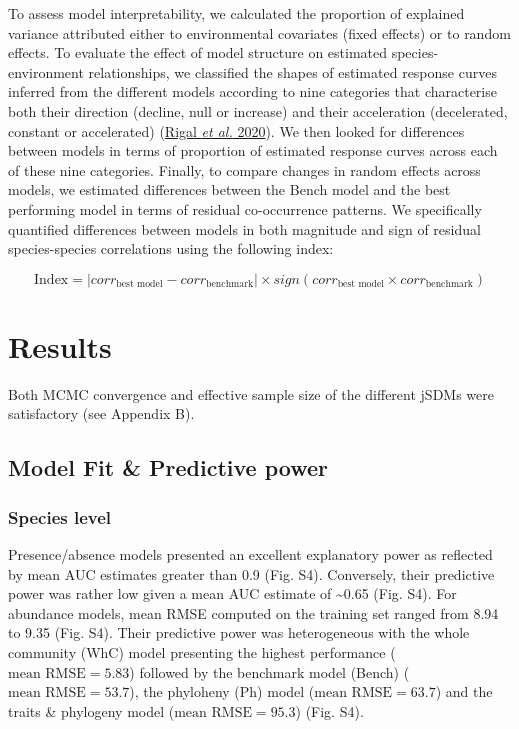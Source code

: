 \documentclass[9pt,biorxiv,doublespacing,lineno]{lapreprint}
\begin{document}
To assess model interpretability, we calculated the proportion of
explained variance attributed either to environmental covariates (fixed
effects) or to random effects. To evaluate the effect of model structure
on estimated species-environment relationships, we classified the shapes
of estimated response curves inferred from the different models
according to nine categories that characterise both their direction
(decline, null or increase) and their acceleration (decelerated,
constant or accelerated) (\protect\hyperlink{ref-Rigal_2020}{Rigal
\emph{et al.} 2020}). We then looked for differences between models in
terms of proportion of estimated response curves across each of these
nine categories. Finally, to compare changes in random effects across
models, we estimated differences between the Bench model and the best
performing model in terms of residual co-occurrence patterns. We
specifically quantified differences between models in both magnitude and
sign of residual species-species correlations using the following index:

\[\text{Index} = |corr_{\text{best model}} - corr_{\text{benchmark}}| \times sign(corr_{\text{best model}} \times corr_{\text{benchmark}})\]

\hypertarget{results}{%
\section{Results}\label{results}}

Both MCMC convergence and effective sample size of the different jSDMs
were satisfactory (see Appendix B).

\hypertarget{model-fit-predictive-power}{%
\subsection{Model Fit \& Predictive
power}\label{model-fit-predictive-power}}

\hypertarget{species-level}{%
\subsubsection{Species level}\label{species-level}}

Presence/absence models presented an excellent explanatory power as
reflected by mean AUC estimates greater than 0.9 (Fig. S4). Conversely,
their predictive power was rather low given a mean AUC estimate of
\textasciitilde0.65 (Fig. S4). For abundance models, mean RMSE computed
on the training set ranged from 8.94 to 9.35 (Fig. S4). Their predictive
power was heterogeneous with the whole community (WhC) model presenting
the highest performance (\(\text{mean RMSE} = 5.83\)) followed by the
benchmark model (Bench) (\(\text{mean RMSE} = 53.7\)), the phyloheny
(Ph) model (\(\text{mean RMSE}=63.7\)) and the traits \& phylogeny model
(\(\text{mean RMSE} = 95.3\)) (Fig. S4).
\end{document}
